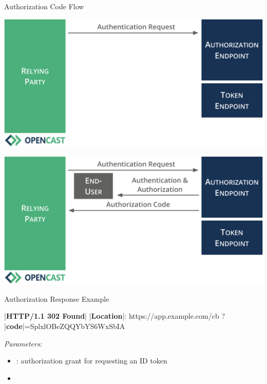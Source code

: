 \documentclass[aspectratio=169]{beamer}
\begin{document}
\begin{frame}{Authorization Code Flow}
	\vspace*{0.2em}
	\begin{overprint}
		\centerline{\includegraphics[height=0.84\textheight]{figures/authorization-code-flow-2}}
		\centerline{\includegraphics[height=0.84\textheight]{figures/authorization-code-flow-3}}
	\end{overprint}
	\vspace{-1.8em}
\end{frame}

\begin{frame}[fragile]{Authorization Response Example}
\begin{textcode}
|\textbf{HTTP/1.1 302 Found}|
|\textbf{Location}|: https://app.example.com/cb
           ?|\textbf{code}|=SplxlOBeZQQYbYS6WxSbIA
\end{textcode}

\hfill {}
	
	\emph{Parameters:}
	\begin{itemize}
		\item {}: authorization grant for requesting an ID token
		\item {}
	\end{itemize}
	
\end{frame}
\end{document}
